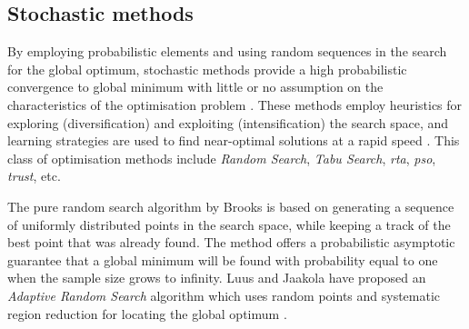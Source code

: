 	\subsection{Stochastic methods}
	By employing probabilistic elements and using random sequences in the search for the global optimum, stochastic methods  provide a high probabilistic convergence to global minimum with little or no assumption on the characteristics of the optimisation problem \cite{Rangaiah:2010aa}. These methods employ heuristics for exploring (diversification) and exploiting (intensification) the search space, and learning strategies are used to find near-optimal solutions at a rapid speed \cite{Blum:2003aa}. This class of optimisation methods include \emph{Random Search}, \emph{Tabu Search}, \emph{\gls{rta}}, \emph{\gls{pso}}, \emph{\gls{trust}}, etc.

	The pure random search algorithm by Brooks \cite{Brooks:1958aa} is based on generating a sequence of uniformly distributed points in the search space, while keeping a track of the best point that was already found. The method offers a probabilistic asymptotic guarantee that a global minimum will be found with probability equal to one when the sample size grows to infinity. Luus and Jaakola have proposed an \emph{Adaptive Random Search} algorithm which uses random points and systematic region reduction for locating the global optimum \cite{Luus:1973aa}.

